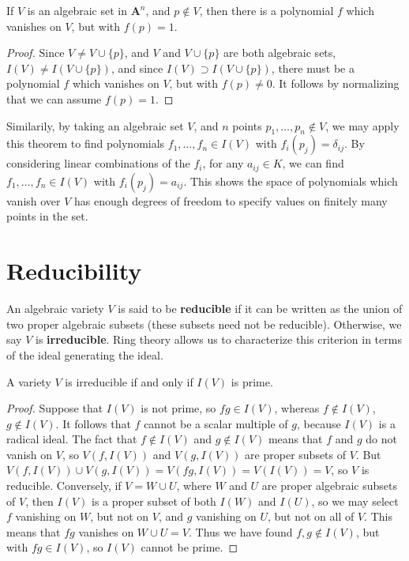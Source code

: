 \begin{corollary}
    If $V$ is an algebraic set in $\mathbf{A}^n$, and $p \not \in V$, then there is a polynomial $f$ which vanishes on $V$, but with $f(p) = 1$.
\end{corollary}
\begin{proof}
    Since $V \neq V \cup \{ p \}$, and $V$ and $V \cup \{ p \}$ are both algebraic sets, $I(V) \neq I(V \cup \{ p \})$, and since $I(V) \supset I(V \cup \{ p \})$, there must be a polynomial $f$ which vanishes on $V$, but with $f(p) \neq 0$. It follows by normalizing that we can assume $f(p) = 1$.
\end{proof}

Similarily, by taking an algebraic set $V$, and $n$ points $p_1, \dots, p_n \not \in V$, we may apply this theorem to find polynomials $f_1, \dots, f_n \in I(V)$ with $f_i(p_j) = \delta_{ij}$. By considering linear combinations of the $f_i$, for any $a_{ij} \in K$, we can find $f_1, \dots, f_n \in I(V)$ with $f_i(p_j) = a_{ij}$. This shows the space of polynomials which vanish over $V$ has enough degrees of freedom to specify values on finitely many points in the set.

\section{Reducibility}

An algebraic variety $V$ is said to be {\bf reducible} if it can be written as the union of two proper algebraic subsets (these subsets need not be reducible). Otherwise, we say $V$ is {\bf irreducible}. Ring theory allows us to characterize this criterion in terms of the ideal generating the ideal.

\begin{prop}
    A variety $V$ is irreducible if and only if $I(V)$ is prime.
\end{prop}
\begin{proof}
    Suppose that $I(V)$ is not prime, so $fg \in I(V)$, whereas $f \not \in I(V)$, $g \not \in I(V)$. It follows that $f$ cannot be a scalar multiple of $g$, because $I(V)$ is a radical ideal. The fact that $f \not \in I(V)$ and $g \not \in I(V)$ means that $f$ and $g$ do not vanish on $V$, so $V(f, I(V))$ and $V(g, I(V))$ are proper subsets of $V$. But $V(f, I(V)) \cup V(g, I(V)) = V(fg, I(V)) = V(I(V)) = V$, so $V$ is reducible. Conversely, if $V = W \cup U$, where $W$ and $U$ are proper algebraic subsets of $V$, then $I(V)$ is a proper subset of both $I(W)$ and $I(U)$, so we may select $f$ vanishing on $W$, but not on $V$, and $g$ vanishing on $U$, but not on all of $V$. This means that $fg$ vanishes on $W \cup U = V$. Thus we have found $f,g \not \in I(V)$, but with $fg \in I(V)$, so $I(V)$ cannot be prime.
\end{proof}

